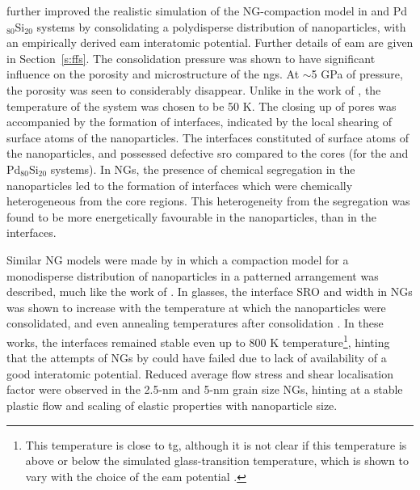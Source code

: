 \textcite{Adjaoud2018} further improved the realistic simulation of the NG-compaction model in \czsix and Pd$_{80}$Si$_{20}$ systems by consolidating a polydisperse distribution of nanoparticles, with an empirically derived \gls{eam} interatomic potential. Further details of \gls{eam} are given in Section~\ref{s:ffs}. The consolidation pressure was shown to have significant influence on the porosity and microstructure of the \gls{ng}s. At $\sim$5 GPa of pressure, the porosity was seen to considerably disappear. Unlike in the work of \textcite{Sopu2009}, the temperature of the system was chosen to be 50 K. The closing up of pores was accompanied by the formation of interfaces, indicated by the local shearing of surface atoms of the nanoparticles. The interfaces constituted of surface atoms of the nanoparticles, and possessed defective \gls{sro} compared to the cores (for the \czsix and Pd$_{80}$Si$_{20}$ systems). In \czsix NGs, the presence of chemical segregation in the nanoparticles led to the formation of interfaces which were chemically heterogeneous from the core regions. This heterogeneity from the segregation was found to be more energetically favourable in the \czsix nanoparticles, than in the interfaces. \par

Similar NG models were made by \textcite{Cheng2019,Cheng2019a} in which a compaction model for a monodisperse distribution of nanoparticles in a patterned arrangement was described, much like the work of \textcite{Sopu2009}. In \czsix glasses, the interface SRO and width in NGs was shown to increase with the temperature at which the nanoparticles were consolidated, and even 
annealing temperatures after consolidation \cite{Cheng2019,Cheng2019a}. In these works, the interfaces remained stable even up to 800 K temperature\footnote{This temperature is close to \czsix \gls{tg}, although it is not clear if this temperature is above or below the simulated 
glass-transition temperature, which is shown to vary with the choice of the \gls{eam} potential \cite{Mendelev2009,Mendelev2019}.}, hinting that the attempts of \cz NGs by \textcite{Sopu2009} could have failed due to lack of availability of a good interatomic potential. Reduced average flow stress and shear localisation factor \cite{Shimizu2007} were observed in the 2.5-nm and 
5-nm grain size NGs, hinting at a stable plastic flow and scaling of elastic properties with nanoparticle size. \par

